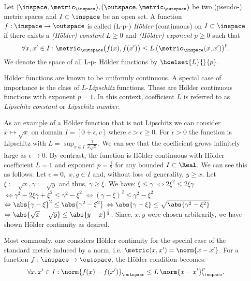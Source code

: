 \begin{defn} 
Let $(\inspace ,\metric_\inspace ), (\outspace , \metric_\outspace )$ be two (pseudo-) metric spaces and 
$I \subset \inspace$ be an open set. A function $f: \inspace \to \outspace $ is called (L-p-) \emph{H\"older} 
(continuous) on $I \subset \inspace$ if there exists a \emph{(H\"older) constant} $L \geq 0$ and \emph{(H\"older) 
exponent} $p\geq 0$ such that 
\[\forall x,x' \in I : \metric_\outspace \bigl(f(x),f(x')\bigr) \leq L \, \bigl( \metric_\inspace (x,x') \bigr)^p. \]
We denote the space of all L-p- H\"older functions by $\hoelset{L}{}{p}$.
\end{defn}

H\"older functions are known to be uniformly continuous. 
A special case of importance is the class of $L$-\textit{Lipschitz} functions. These are H\"older continuous 
functions with exponent $p=1$. In this context, coefficient $L$ is referred to as\textit{ Lipschitz constant} or \textit{Lipschitz number}.

\begin{ex}\label{ex:sqrtfctHoelder}
As an example of a H\"older function that is not Lipschitz we can consider $x \mapsto \sqrt x$ on domain $I = [0+\epsilon,c]$ where 
$c >\epsilon \geq 0 $. For $\epsilon >0 $ the function is Lipschitz with $L = \sup_{x \in I} \frac{1} {2 \sqrt{x}}$. We can see that the 
coefficient grows infinitely large as $\epsilon \to 0$. By contrast, the function is H\"older continuous 
with H\"older coefficient $L=1$ and exponent $p=\frac 1 2 $ for any bounded $I \subset \Real$.
We can see this as follows: Let $\epsilon =0,$ $x,y \in I$ and, without loss of generality,  $y \geq x$. Let $\xi := \sqrt{x}, \gamma := \sqrt{y}$ and thus, $\gamma \geq \xi$. We have:
$\xi \leq \gamma $ $\Leftrightarrow 2 \xi^2 \leq 2\xi\gamma$ $\Leftrightarrow \gamma^2 - 2 \xi\gamma + \xi^2  \leq \gamma^2 - \xi^2$ $\Leftrightarrow (\gamma-\xi)^2  \leq \gamma^2-\xi^2$ $\Leftrightarrow \abs{\gamma-\xi}^2  \leq \abs{\gamma^2-\xi^2}$
$\Leftrightarrow \abs{\gamma-\xi}  \leq \sqrt{\abs{\gamma^2-\xi^2}}$  $\Leftrightarrow \abs{\sqrt{x}-\sqrt{y}} \leq \abs{y-x}^{\frac{1}{2}}$. Since, $x,y$ were chosen arbitrarily, we have shown H\"older continuity as desired.
\end{ex}

Most commonly, one considers H\"older continuity for the special case of the standard metric induced by a norm, i.e.  $\metric(x,x') = \norm{x-x'}$.
For a function $f: \inspace \to \outspace$, the H\"older condition becomes:
\[\forall x,x' \in I : \norm{f(x)-f(x')}_\outspace \leq L \, \norm{x-x'}_\inspace^p. \]

